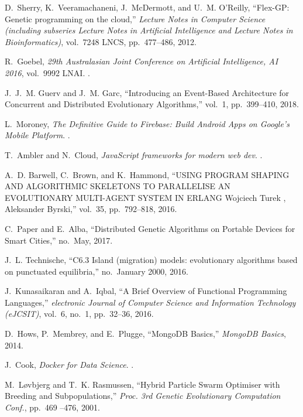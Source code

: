 \documentclass[runningheads]{llncs}
\begin{document}
\begin{thebibliography}{10}
    D.~Sherry, K.~Veeramachaneni, J.~McDermott, and U.~M. O'Reilly, ``{Flex-GP:
      Genetic programming on the cloud},'' {\em Lecture Notes in Computer Science
      (including subseries Lecture Notes in Artificial Intelligence and Lecture
      Notes in Bioinformatics)}, vol.~7248 LNCS, pp.~477--486, 2012.
    
    R.~Goebel, {\em {29th Australasian Joint Conference on Artificial Intelligence,
      AI 2016}}, vol.~9992 LNAI.
    .
    
    J.~J.~M. Guerv and J.~M. Garc, ``{Introducing an Event-Based Architecture for
      Concurrent and Distributed Evolutionary Algorithms},'' vol.~1, pp.~399--410,
      2018.
    
    L.~Moroney, {\em {The Definitive Guide to Firebase: Build Android Apps on
      Google's Mobile Platform}}.
    .
    
    T.~Ambler and N.~Cloud, {\em {JavaScript frameworks for modern web dev}}.
    .
    
    A.~D. Barwell, C.~Brown, and K.~Hammond, ``{USING PROGRAM SHAPING AND
      ALGORITHMIC SKELETONS TO PARALLELISE AN EVOLUTIONARY MULTI-AGENT SYSTEM IN
      ERLANG Wojciech Turek , Aleksander Byrski},'' vol.~35, pp.~792--818, 2016.
    
    C.~Paper and E.~Alba, ``{Distributed Genetic Algorithms on Portable Devices for
      Smart Cities},'' no.~May, 2017.
    
    J.~L. Technische, ``{C6.3 Island (migration) models: evolutionary algorithms
      based on punctuated equilibria},'' no.~January 2000, 2016.
    
    J.~Kunasaikaran and A.~Iqbal, ``{A Brief Overview of Functional Programming
      Languages},'' {\em electronic Journal of Computer Science and Information
      Technology (eJCSIT)}, vol.~6, no.~1, pp.~32--36, 2016.
    
    D.~Hows, P.~Membrey, and E.~Plugge, ``{MongoDB Basics},'' {\em MongoDB Basics},
      2014.
    
    J.~Cook, {\em {Docker for Data Science}}.
    .
    
    M.~L{\o}vbjerg and T.~K. Rasmussen, ``{Hybrid Particle Swarm Optimiser with
      Breeding and Subpopulations},'' {\em Proc. 3rd Genetic Evolutionary
      Computation Conf.}, pp.~469 --476, 2001.
    

\end{thebibliography}
\end{document}
